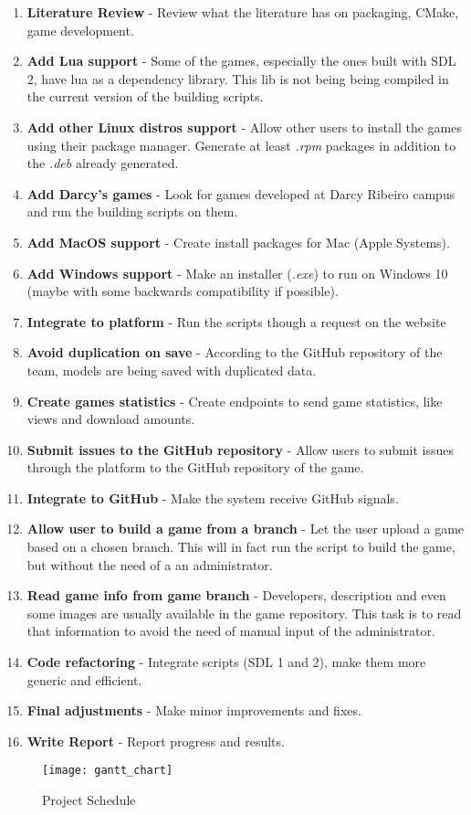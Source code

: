 \begin{enumerate}
\item \textbf{Literature Review} - Review what the literature has on packaging, CMake, game development.
\item \textbf{Add Lua support} - Some of the games, especially the ones built with SDL 2, have lua as a dependency library. This lib is not being being compiled in the current version of the building scripts.
\item \textbf{Add other Linux distros support} - Allow other users to install the games using their package manager. Generate at least \textit{.rpm} packages in addition to the \textit{.deb} already generated.
\item \textbf{Add Darcy's games} - Look for games developed at Darcy Ribeiro campus and run the building scripts on them.
\item \textbf{Add MacOS support} - Create install packages for Mac (Apple Systems).
\item \textbf{Add Windows support} - Make an installer (\textit{.exe}) to run on Windows 10 (maybe with some backwards compatibility if possible).
\item \textbf{Integrate to platform} - Run the scripts though a request on the website
\item \textbf{Avoid duplication on save} - According to the GitHub repository of the team, models are being saved with duplicated data.
\item \textbf{Create games statistics} - Create endpoints to send game statistics, like views and download amounts.
\item \textbf{Submit issues to the GitHub repository} - Allow users to submit issues through the platform to the GitHub repository of the game.
\item \textbf{Integrate to GitHub} - Make the system receive GitHub signals.
\item \textbf{Allow user to build a game from a branch} - Let the user upload a game based on a chosen branch. This will in fact run the script to build the game, but without the need of a an administrator.
\item \textbf{Read game info from game branch} - Developers, description and even some images are usually available in the game repository. This task is to read that information to avoid the need of manual input of the administrator.
\item \textbf{Code refactoring} - Integrate scripts (SDL 1 and 2), make them more generic and efficient.
\item \textbf{Final adjustments} - Make minor improvements and fixes.
\item \textbf{Write Report} - Report progress and results.
\end{enumerate}

\begin{figure}[h!]
\centering
\texttt{[image: gantt\_chart]}
\caption{Project Schedule}
\label{fig:schedule}
\end{figure}

